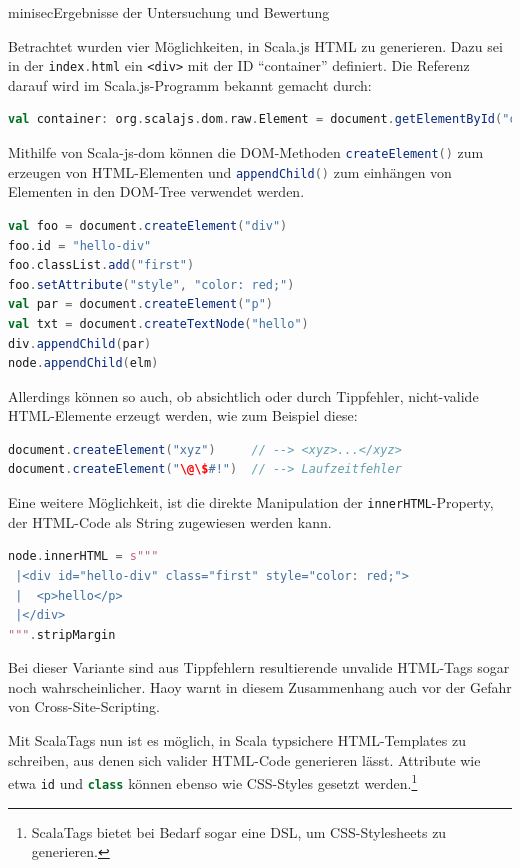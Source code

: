 \documentclass[a4paper, 12pt, hidelinks, listof=totoc, listoftables=totoc, bibliography=totoc]{scrreprt}
\newcommand{\code}[1]{\lstinline[language=Scala, style=inline]|#1|}
\newcommand{\scala}[1]{\lstinline[language=Scala, style=inline]|#1|}
\newcommand{\html}[1]{\lstinline[language=HTML5, style=inline]|#1|}
\begin{document}
minisec{Ergebnisse der Untersuchung und Bewertung}

Betrachtet wurden vier Möglichkeiten, in Scala.js \ac{HTML} zu generieren. Dazu sei in der \code{index.html} ein
\html{<div>} mit der ID "`container"' definiert. Die Referenz darauf wird im Scala.js-Programm bekannt gemacht durch:

\begin{lstlisting}[language=Scala, style=snippet]
val container: org.scalajs.dom.raw.Element = document.getElementById("container")
\end{lstlisting}

Mithilfe von Scala-js-dom können die \ac{DOM}-Methoden \scala{createElement()} zum erzeugen von \ac{HTML}-Elementen und \scala{appendChild()} zum einhängen von Elementen in den DOM-Tree verwendet werden.

\begin{lstlisting}[language=Scala, caption={HTML-Generierung mit Scala-js-dom und Nodes.}]
val foo = document.createElement("div")
foo.id = "hello-div"
foo.classList.add("first")
foo.setAttribute("style", "color: red;")
val par = document.createElement("p")
val txt = document.createTextNode("hello")
div.appendChild(par)
node.appendChild(elm)
\end{lstlisting}

Allerdings können so auch, ob absichtlich oder durch Tippfehler, nicht-valide \ac{HTML}-Elemente erzeugt werden, wie zum Beispiel diese:
\begin{lstlisting}[language=Scala, style=snippet]
document.createElement("xyz")     // --> <xyz>...</xyz>
document.createElement("\@\$#!")  // --> Laufzeitfehler
\end{lstlisting}

Eine weitere Möglichkeit, ist die direkte Manipulation der \code{innerHTML}-Property, der \ac{HTML}-Code als String zugewiesen werden kann.

\begin{lstlisting}[language=Scala, caption={HTML-Generierung mit Scala-js-dom und Strings.}]
node.innerHTML = s"""
 |<div id="hello-div" class="first" style="color: red;">
 |  <p>hello</p>
 |</div>
""".stripMargin
\end{lstlisting}

Bei dieser Variante sind aus Tippfehlern resultierende unvalide \ac{HTML}-Tags sogar noch wahrscheinlicher. Haoy warnt in diesem Zusammenhang auch vor der Gefahr von Cross-Site-Scripting.\cite[\#HelloWorld:HTML]{haoyi.HOS}

Mit ScalaTags nun ist es möglich, in Scala typsichere \ac{HTML}-Templates zu schreiben, aus denen sich valider \ac{HTML}-Code generieren lässt. Attribute wie etwa \code{id} und \code{class} können ebenso wie CSS-Styles gesetzt werden.\footnote{ScalaTags bietet bei Bedarf sogar eine \ac{DSL}, um CSS-Stylesheets zu generieren.}
\end{document}
